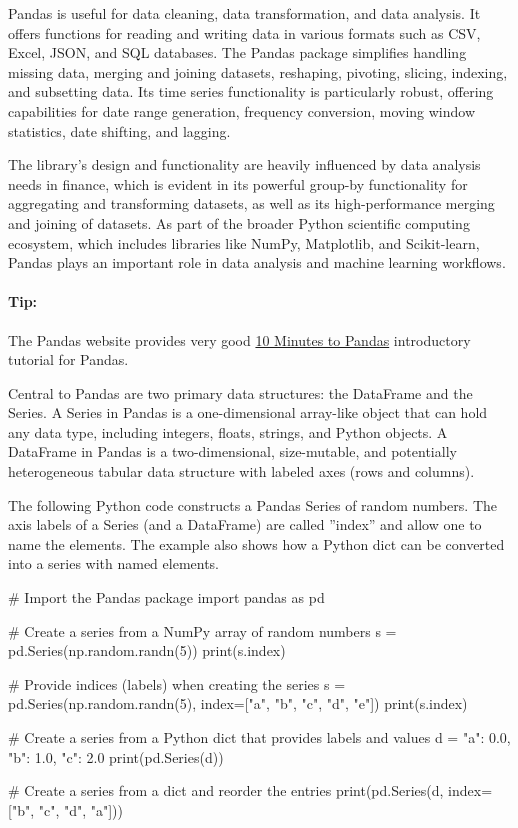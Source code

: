 Pandas is useful for data cleaning, data transformation, and data analysis. It offers functions for reading and writing data in various formats such as CSV, Excel, JSON, and SQL databases. The Pandas package simplifies handling missing data, merging and joining datasets, reshaping, pivoting, slicing, indexing, and subsetting data. Its time series functionality is particularly robust, offering capabilities for date range generation, frequency conversion, moving window statistics, date shifting, and lagging.

The library's design and functionality are heavily influenced by data analysis needs in finance, which is evident in its powerful group-by functionality for aggregating and transforming datasets, as well as its high-performance merging and joining of datasets. As part of the broader Python scientific computing ecosystem, which includes libraries like NumPy, Matplotlib, and Scikit-learn, Pandas plays an important role in data analysis and machine learning workflows.

\begin{tcolorbox}[colback=code]
\paragraph*{Tip:}
The Pandas website provides very good \href{http://pandas.pydata.org/docs/user_guide/10min.html}{10 Minutes to Pandas} introductory tutorial for Pandas.
\end{tcolorbox}

Central to Pandas are two primary data structures: the DataFrame and the Series. A Series in Pandas is a one-dimensional array-like object that can hold any data type, including integers, floats, strings, and Python objects. A DataFrame in Pandas is a two-dimensional, size-mutable, and potentially heterogeneous tabular data structure with labeled axes (rows and columns).

The following Python code constructs a Pandas Series of random numbers. The axis labels of a Series (and a DataFrame) are called ''index'' and allow one to name the elements. The example also shows how a Python dict can be converted into a series with named elements.

\begin{samepage}
\begin{pythoncode}
# Import the Pandas package
import pandas as pd

# Create a series from a NumPy array of random numbers
s = pd.Series(np.random.randn(5))
print(s.index)

# Provide indices (labels) when creating the series
s = pd.Series(np.random.randn(5), index=["a", "b", "c", "d", "e"])
print(s.index)

# Create a series from a Python dict that provides labels and values
d = {"a": 0.0, "b": 1.0, "c": 2.0}
print(pd.Series(d))

# Create a series from a dict and reorder the entries
print(pd.Series(d, index=["b", "c", "d", "a"]))
\end{pythoncode}
\end{samepage}

